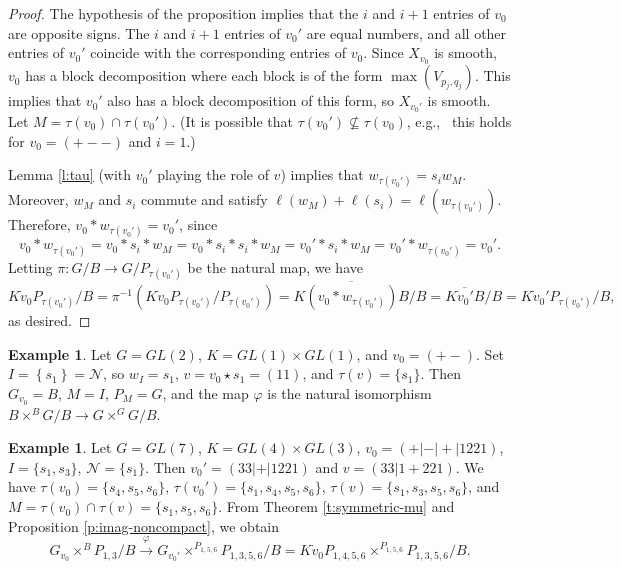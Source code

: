 \documentclass[11pt,letterpaper,reqno]{amsart}
\newcommand{\cN}{\mathcal N}
\numberwithin{equation}{section}
\theoremstyle{plain}
\theoremstyle{definition}
\newtheorem{example}[theorem]{Example}
\theoremstyle{remark}
\begin{document}
\begin{proof}
The hypothesis of the proposition implies that the $i$ and $i+1$ entries of $v_0$ are opposite signs.  
The $i$ and $i+1$ entries of $v_0'$ are equal numbers, and all other entries of $v_0'$ coincide with
the corresponding entries of $v_0$.  Since $X_{v_0}$ is smooth, $v_0$ has a block decomposition
where each block is of the form $\max(V_{p_j,q_j})$.  This implies that $v_0'$ also has a block decomposition
of this form, so $X_{v_0'}$ is smooth.  Let $M = \tau(v_0) \cap \tau(v_0')$. 
(It is possible that $\tau(v_0') \not\subseteq \tau(v_0)$, e.g.,~ this holds for 
$v_0 = (+--)$ and $i = 1$.)
 
Lemma \ref{l:tau} (with $v_0'$ playing the role of $v$)  implies that $w_{\tau(v_0')} = s_{i} w_M $.  
Moreover, $w_M$ and $s_{i}$ commute and satisfy
$\ell(w_M) + \ell(s_{i}) = \ell(w_{\tau(v_0')})$.  Therefore,
$v_0 * w_{\tau(v_0')} = v_0'$, since
$$
v_0 * w_{\tau(v_0')} = v_0 * s_{i} * w_M = v_0 * s_{i} * s_{i} * w_M = v_0' * s_{i} * w_M = v_0' *  w_{\tau(v_0')} = v_0'.
$$
Letting $\pi: G/B \to G/P_{\tau(v_0')}$ be the natural map, we have 
$$
K \dot{v}_0 P_{\tau(v_0')}/B = \pi^{-1} (K \dot{v}_0 P_{\tau(v_0')}/P_{\tau(v_0')}) = \overline{K (v_0 * w_{\tau(v_0')}) B}/B = \overline{K \dot{v}_0' B}/B = K \dot{v}_0' P_{\tau(v_0')}/B,
$$
as desired.
\end{proof}



\begin{example}
Let $G = GL(2)$, $K = GL(1) \times GL(1)$, and \(v_0=(+-)\).
Set $I=\left\{s_1\right\}  = \cN$, so \(w_I=s_{1}\), \(v=v_0\star s_{1}=(11)\), and $\tau(v) = \{ s_{1} \}$.
Then $G_{v_0} = B$, $M = I$, $P_M = G$,
and the map $\varphi$ is the natural isomorphism
$B \times^B G/B \to G \times^G G/B$.
\end{example}

\begin{example}
Let $G = GL(7)$, $K = GL(4) \times GL(3)$, $v_0 = (+|-|+|1221)$, $I = \{s_1,s_3 \}$, $\cN = \{s_1 \}$.  Then
$v_0' = (33|+|1221)$ and $v = (33|1+221)$.  We have $\tau(v_0) = \{ s_4,s_5,s_6 \}$, $\tau(v_0') = \{ s_1,s_4,s_5,s_6 \}$,
$\tau(v) = \{ s_1,s_3,s_5,s_6 \}$, and $M = \tau(v_0) \cap \tau(v) = \{s_1,s_5,s_6 \}$.  From
Theorem \ref{t:symmetric-mu} and Proposition \ref{p:imag-noncompact}, we obtain 
$$
G_{v_0} \times^B P_{1,3}/B  \stackrel{\varphi}{\longrightarrow}   G_{v_0'} \times^{P_{1,5,6}} P_{1,3,5,6}/B  
=  K \dot{v}_0 P_{1,4,5,6} \times^{P_{1,5,6}} P_{1,3,5,6}/B.
$$
\end{example}
\end{document}

